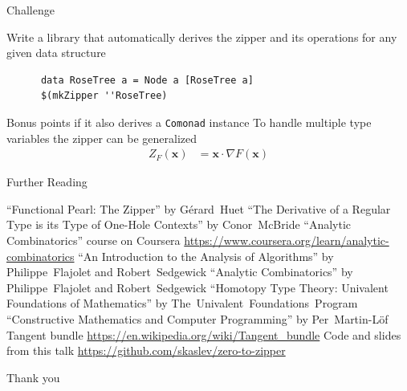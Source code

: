 \documentclass[pdf]{beamer}
\begin{document}
\begin{frame}[fragile]{Challenge}
  \begin{outline}
    \1 Write a library that automatically derives the zipper and its operations for any given data structure
    \vspace{5mm}
    \begin{verbatim}
      data RoseTree a = Node a [RoseTree a]
      $(mkZipper ''RoseTree)
    \end{verbatim}
    \vspace{3mm}
    \2 Bonus points if it also derives a \lstinline{Comonad} instance
    \vspace{1cm}
    \1 To handle multiple type variables the zipper can be generalized
    \begin{align*}
      Z_F(\bm{x}) &= \bm{x} \cdot \nabla F(\bm{x})
    \end{align*}
  \end{outline}
\end{frame}

\begin{frame}{Further Reading}
  \small
  \begin{outline}
    \1 ``Functional Pearl: The Zipper'' by \mbox{G\'erard Huet}
    \1 ``The Derivative of a Regular Type is its Type of One-Hole Contexts'' by \mbox{Conor McBride}
    \1 ``Analytic Combinatorics'' course on Coursera \url{https://www.coursera.org/learn/analytic-combinatorics}
    \1 ``An Introduction to the Analysis of Algorithms'' by \mbox{Philippe Flajolet} and \mbox{Robert Sedgewick}
    \1 ``Analytic Combinatorics'' by \mbox{Philippe Flajolet} and \mbox{Robert Sedgewick}
    \1 ``Homotopy Type Theory: Univalent Foundations of Mathematics'' by \mbox{The Univalent Foundations Program}
    \1 ``Constructive Mathematics and Computer Programming'' by \mbox{Per Martin-L\"{o}f}
    \1 Tangent bundle \url{https://en.wikipedia.org/wiki/Tangent_bundle}
    \1 Code and slides from this talk \url{https://github.com/skaslev/zero-to-zipper}
  \end{outline}
\end{frame}

\begin{frame}{Thank you}
\end{frame}
\end{document}
